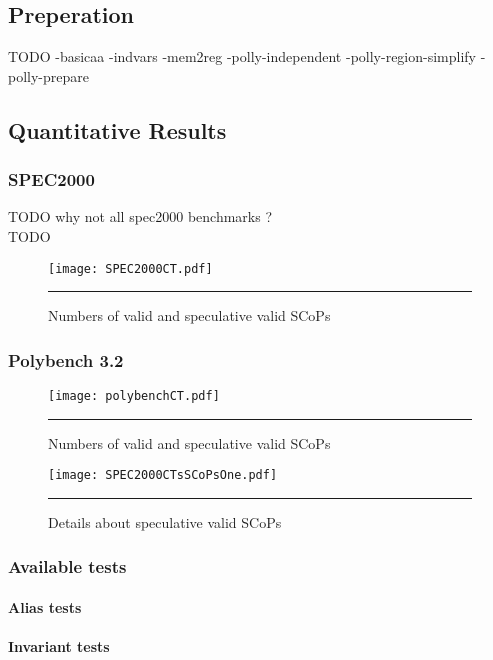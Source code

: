 \subsection{Preperation}
TODO
 -basicaa -indvars -mem2reg -polly-independent -polly-region-simplify -polly-prepare 


\subsection{Quantitative Results}

\subsubsection{SPEC2000}
TODO why not all spec2000 benchmarks ? \\
TODO 
\begin{figure}[htbp]
	\centering
        \texttt{[image: SPEC2000CT.pdf]}
		\rule{35em}{0.5pt}
	\caption{Numbers of valid and speculative valid SCoPs}
	\label{fig:SPEC2000CT}
\end{figure}

\subsubsection{Polybench 3.2}
\begin{figure}[htbp]
	\centering
        \texttt{[image: polybenchCT.pdf]}
		\rule{35em}{0.5pt}
	\caption{Numbers of valid and speculative valid SCoPs}
	\label{fig:polybenchCT}
\end{figure}


\begin{figure}[htbp]
	\centering
        \texttt{[image: SPEC2000CTsSCoPsOne.pdf]}
		\rule{35em}{0.5pt}
	\caption{Details about speculative valid SCoPs}
	\label{fig:SPEC2000CTsSCoPsOne}
\end{figure}

\subsubsection{Available tests}

\paragraph{Alias tests}


\paragraph{Invariant tests}




